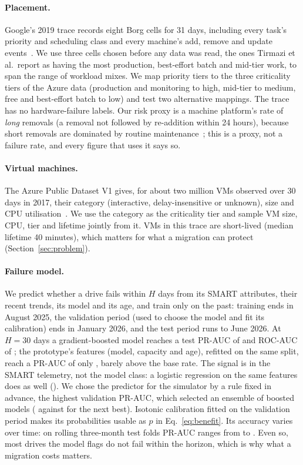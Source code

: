 \paragraph{Placement.}
Google's 2019 trace records eight Borg cells for 31 days, including every task's priority and
scheduling class and every machine's add, remove and update events~\cite{tirmazi2020borg}. We
use three cells chosen before any data was read, the ones Tirmazi et al.\ report as having the
most production, best-effort batch and mid-tier work, to span the range of workload mixes. We
map priority tiers to the three criticality tiers of the Azure data (production and monitoring
to high, mid-tier to medium, free and best-effort batch to low) and test two alternative
mappings. The trace has no hardware-failure labels. Our risk proxy is a machine platform's rate
of \emph{long} removals (a removal not followed by re-addition within 24 hours), because short
removals are dominated by routine maintenance~\cite{tirmazi2020borg}; this is a proxy, not a
failure rate, and every figure that uses it says so.

\paragraph{Virtual machines.}
The Azure Public Dataset V1 gives, for about two million VMs observed over 30 days in 2017,
their category (interactive, delay-insensitive or unknown), size and CPU
utilisation~\cite{cortez2017resource}. We use the category as the criticality tier and sample
VM size, CPU, tier and lifetime jointly from it. VMs in this trace are short-lived (median
lifetime 40 minutes), which matters for what a migration can protect
(Section~\ref{sec:problem}).

\paragraph{Failure model.}
\label{sec:model}
We predict whether a drive fails within $H$ days from its SMART attributes, their recent trends,
its model and its age, and train only on the past: training ends in August 2025, the validation
period (used to choose the model and fit its calibration) ends in January 2026, and the test
period runs to June 2026. At $H=30$ days a gradient-boosted model reaches a test PR-AUC of
\VPrAucSMART{} and ROC-AUC of \VRocAucSMART; the prototype's features (model, capacity and age),
refitted on the same split, reach a PR-AUC of only \VPrAucVOneFeatures, barely above the base
rate. The signal is in the SMART telemetry, not the model class: a logistic regression on the
same features does as well (\VPrAucLogit). We chose the predictor for the simulator by a rule
fixed in advance, the highest validation PR-AUC, which selected an ensemble of boosted models
(\VPrAucEnsembleVal{} against \VPrAucLogitVal{} for the next best). Isotonic calibration fitted on
the validation period makes its probabilities usable as $p$ in Eq.~\eqref{eq:benefit}. Its accuracy varies
over time: on rolling three-month test folds PR-AUC ranges from \VPrAucFoldMin{} to \VPrAucFoldMax. Even so,
most drives the model flags do not fail within the horizon, which is why what a migration costs
matters.

